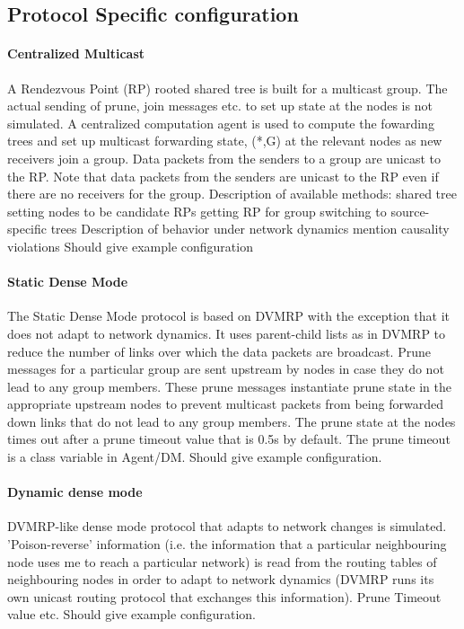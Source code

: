\subsection{Protocol Specific configuration}

\paragraph{Centralized Multicast}
A Rendezvous Point (RP) rooted shared tree is built
for a multicast group.
The actual sending
of prune, join messages etc.
to set up state at the nodes is not simulated.
A centralized computation agent is used
to compute the fowarding trees and set up 
multicast forwarding state, (*,G) at the relevant nodes
as new receivers join a group.
Data packets from the senders to a group
are unicast to the RP.
Note that data packets
from the senders are unicast to the RP
even if there are no receivers for the group.
Description of available methods:
	shared tree
		setting nodes to be candidate RPs
                getting RP for group
	switching to source-specific trees
Description of behavior under network dynamics
	mention causality violations
Should give example configuration

\paragraph{Static Dense Mode}
The Static Dense Mode protocol 
is based on DVMRP with the exception
that it does not adapt to network dynamics.
It uses parent-child lists as in DVMRP
to reduce the number of links over which the
data packets are broadcast.
Prune messages for a particular group
are sent upstream by nodes in case they do not lead
to any group members.
These prune messages instantiate prune state
in the appropriate upstream nodes to prevent multicast
packets from being forwarded down links
that do not lead to any group members.
The prune state at the nodes times out
after a prune timeout value that is 0.5s by default.
The prune timeout is a class variable in Agent/DM.
Should give example configuration.

\paragraph{Dynamic dense mode}
DVMRP-like dense mode protocol that
adapts to network changes is simulated.
'Poison-reverse' information
(i.e. the information that a particular neighbouring node
uses me to reach a particular network)
is read from the routing tables of neighbouring nodes
in order to adapt to network dynamics
(DVMRP runs its own unicast routing protocol
that exchanges this information).
Prune Timeout value etc.
Should give example configuration.

